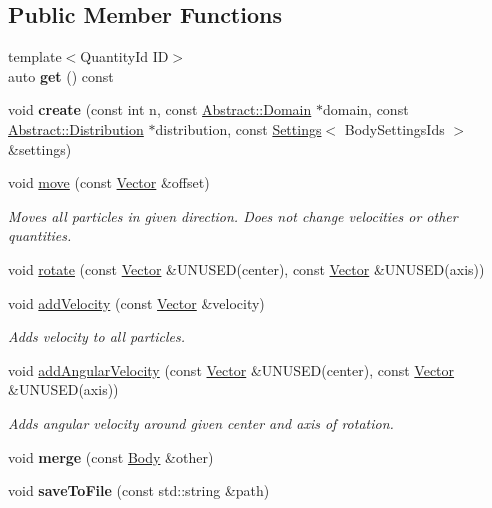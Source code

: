 \subsection*{Public Member Functions}
\begin{DoxyCompactItemize}
\item 
\hypertarget{classBody_a6e58829bd25233b0331c2e62b8d8934e}{}\label{classBody_a6e58829bd25233b0331c2e62b8d8934e} 
{\footnotesize template$<$Quantity\+Id ID$>$ }\\auto {\bfseries get} () const
\item 
\hypertarget{classBody_a345a4e3c96434dbb98740e78b2b2f615}{}\label{classBody_a345a4e3c96434dbb98740e78b2b2f615} 
void {\bfseries create} (const int n, const \hyperlink{classAbstract_1_1Domain}{Abstract\+::\+Domain} $\ast$domain, const \hyperlink{classAbstract_1_1Distribution}{Abstract\+::\+Distribution} $\ast$distribution, const \hyperlink{classSettings}{Settings}$<$ Body\+Settings\+Ids $>$ \&settings)
\item 
\hypertarget{classBody_acf614ab6b2734aa52bd8de02a0211ead}{}\label{classBody_acf614ab6b2734aa52bd8de02a0211ead} 
void \hyperlink{classBody_acf614ab6b2734aa52bd8de02a0211ead}{move} (const \hyperlink{classBasicVector}{Vector} \&offset)
\begin{DoxyCompactList}\small\item\em Moves all particles in given direction. Does not change velocities or other quantities. \end{DoxyCompactList}\item 
void \hyperlink{classBody_ad506a868ff9e989282cb948d44f35f42}{rotate} (const \hyperlink{classBasicVector}{Vector} \&U\+N\+U\+S\+ED(center), const \hyperlink{classBasicVector}{Vector} \&U\+N\+U\+S\+ED(axis))
\item 
\hypertarget{classBody_acd8c26a7a416b6c579ca7ca447552fd1}{}\label{classBody_acd8c26a7a416b6c579ca7ca447552fd1} 
void \hyperlink{classBody_acd8c26a7a416b6c579ca7ca447552fd1}{add\+Velocity} (const \hyperlink{classBasicVector}{Vector} \&velocity)
\begin{DoxyCompactList}\small\item\em Adds velocity to all particles. \end{DoxyCompactList}\item 
void \hyperlink{classBody_aefc7d09616d51ba1652a4a6940b06c5e}{add\+Angular\+Velocity} (const \hyperlink{classBasicVector}{Vector} \&U\+N\+U\+S\+ED(center), const \hyperlink{classBasicVector}{Vector} \&U\+N\+U\+S\+ED(axis))
\begin{DoxyCompactList}\small\item\em Adds angular velocity around given center and axis of rotation. \end{DoxyCompactList}\item 
\hypertarget{classBody_a39e2c28c977c5c6f1ab30b8790186eee}{}\label{classBody_a39e2c28c977c5c6f1ab30b8790186eee} 
void {\bfseries merge} (const \hyperlink{classBody}{Body} \&other)
\item 
\hypertarget{classBody_ade96d728b06622303593eef008a58591}{}\label{classBody_ade96d728b06622303593eef008a58591} 
void {\bfseries save\+To\+File} (const std\+::string \&path)
\end{DoxyCompactItemize}
